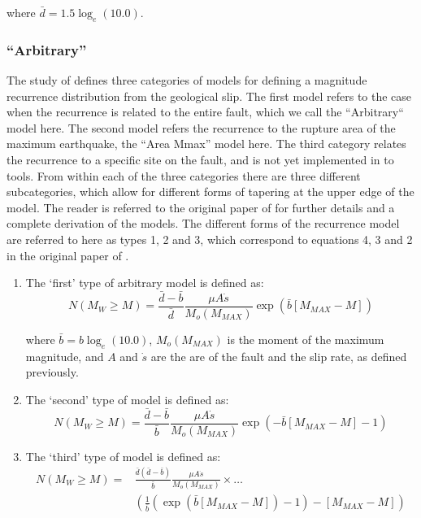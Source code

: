 where $\bar{d} = 1.5 \log_e \left( {10.0} \right)$.

\subsubsection{\textcite{AndersonLuco1983} ``Arbitrary''}

The study of \textcite{AndersonLuco1983} defines three categories of models for defining a magnitude recurrence distribution from the geological slip. The first model refers to the case when the recurrence is related to the entire fault, which we call the ``Arbitrary`` model here. The second model refers the recurrence to the rupture area of the maximum earthquake, the ``Area Mmax'' model here. The third category relates the recurrence to a specific site on the fault, and is not yet implemented in to tools. From within each of the three categories there are three different subcategories, which allow for different forms of tapering at the upper edge of the model. The reader is referred to the original paper of \textcite{AndersonLuco1983} for further details and a complete derivation of the models. The different forms of the recurrence model are referred to here as types 1, 2 and 3, which correspond to equations 4, 3 and 2 in the original paper of \textcite{AndersonLuco1983}. 

\begin{enumerate}
\item The `first' type of \textcite{AndersonLuco1983} arbitrary model is defined as:
\begin{equation}
N \left( {M_W \geq M} \right) = \frac{\bar{d} - \bar{b}}{\bar{d}} \frac{\mu A \dot{s}}{M_o \left( {M_{MAX}} \right)} \exp \left( {\bar{b} \left[ {M_{MAX} - M} \right]} \right)
\end{equation}

where $\bar{b} = b \log_e \left( {10.0} \right)$, $M_o \left( {M_{MAX}} \right)$ is the moment of the maximum magnitude, and $A$ and $\dot{s}$ are the are of the fault and the slip rate, as defined previously.

\item The `second' type of model is defined as:
\begin{equation}
N \left( {M_W \geq M} \right) = \frac{\bar{d} - \bar{b}}{\bar{b}} \frac{\mu A \dot{s}}{M_o \left( {M_{MAX}} \right)} \exp \left( {-\bar{b} \left[ {M_{MAX} - M} \right] - 1} \right)
\end{equation}

\item The `third' type of model is defined as:
\begin{equation}\begin{split}
N \left( {M_W \geq M} \right) = & \frac{\bar{d} \left( {\bar{d} - \bar{b}} \right)}{\bar{b}} \frac{\mu A \dot{s}}{M_o \left( {M_{MAX}} \right)} \times \ldots \\
&\left( {\frac{1}{\bar{b}} \left( {\exp \left( {\bar{b} \left[ {M_{MAX} - M} \right]} \right) - 1} \right)  - \left[ {M_{MAX} - M} \right]} \right)
\end{split}\end{equation}
\end{enumerate}

